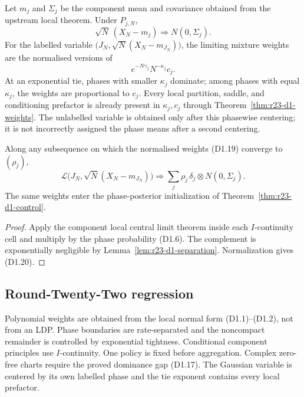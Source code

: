 Let $m_j$ and $\Sigma_j$ be the component mean and covariance obtained from the
upstream local theorem.  Under $P_{j,N}$,
\[
 \sqrt N\,(X_N-m_j)\Rightarrow N(0,\Sigma_j).             \tag{D1.18}
\]
For the labelled variable
$\bigl(J_N,\sqrt N(X_N-m_{J_N})\bigr)$, the limiting mixture weights are the
normalised versions of
\[
 e^{-N\gamma_j}N^{-\kappa_j}c_j.                         \tag{D1.19}
\]
At an exponential tie, phases with smaller $\kappa_j$ dominate; among phases
with equal $\kappa_j$, the weights are proportional to $c_j$.  Every local
partition, saddle, and conditioning prefactor is already present in
$\kappa_j,c_j$ through Theorem~\ref{thm:r23-d1-weights}.  The unlabelled
variable is obtained only after this phasewise centering; it is not incorrectly
assigned the phase means after a second centering.

\begin{theorem}
\label{thm:r23-d1-gaussian}
Along any subsequence on which the normalised weights (D1.19) converge to
$(\rho_j)$,
\[
 \mathcal L\bigl(J_N,\sqrt N(X_N-m_{J_N})\bigr)
 \Rightarrow\sum_j\rho_j\,\delta_j\otimes N(0,\Sigma_j).\tag{D1.20}
\]
The same weights enter the phase-posterior initialization of
Theorem~\ref{thm:r23-d1-control}.
\end{theorem}

\begin{proof}
Apply the component local central limit theorem inside each $I$-continuity
cell and multiply by the phase probability (D1.6).  The complement is
exponentially negligible by Lemma~\ref{lem:r23-d1-separation}.  Normalization
gives (D1.20).
\end{proof}

\subsection{Round-Twenty-Two regression}

Polynomial weights are obtained from the local normal form (D1.1)--(D1.2), not
from an LDP.  Phase boundaries are rate-separated and the noncompact remainder
is controlled by exponential tightness.  Conditional component principles use
$I$-continuity.  One policy is fixed before aggregation.  Complex zero-free
charts require the proved dominance gap (D1.17).  The Gaussian variable is
centered by its own labelled phase and the tie exponent contains every local
prefactor.
